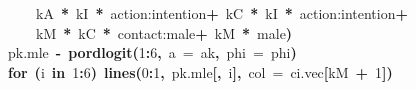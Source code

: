 \documentclass{article}
\makeatletter
\newcommand{\hlnumber}[1]{\textcolor[rgb]{0,0,0}{#1}}%
\newcommand{\hlfunctioncall}[1]{\textcolor[rgb]{.5,0,.33}{\textbf{#1}}}%
\newcommand{\hlkeyword}[1]{\textbf{#1}}%
\newcommand{\hlargument}[1]{\textcolor[rgb]{.69,.25,.02}{#1}}%
\newcommand{\hlassignement}[1]{\textbf{#1}}%
\newcommand{\hlsymbol}[1]{#1}%
\newcommand{\hlstd}[1]{\textcolor[rgb]{0,0,0}{#1}}%
\newenvironment{kframe}{%
 \def\FrameCommand##1{\hskip\@totalleftmargin \hskip-\fboxsep
 \colorbox{shadecolor}{##1}\hskip-\fboxsep
     \hskip-\linewidth \hskip-\@totalleftmargin \hskip\columnwidth}%
 \MakeFramed {\advance\hsize-\width
   \@totalleftmargin\z@ \linewidth\hsize
   \@setminipage}}%
 {\par\unskip\endMakeFramed}
\newenvironment{knitrout}{}{} %
\makeatother
\begin{document}
\begin{knitrout}
{\begin{kframe}
\begin{flushleft}
\hlstd{}{\ }{\ }{\ }{\ }{\ }{\ }{\ }{\ }{\ }{\ }{\ }{\ }\hlsymbol{kA}{\ }\hlkeyword{*}{\ }\hlsymbol{kI}{\ }\hlkeyword{*}{\ }\hlsymbol{\usebox{\hlnormalsizeboxbacktick}action:intention\usebox{\hlnormalsizeboxbacktick}}{\ }\hlkeyword{+}{\ }\hlsymbol{kC}{\ }\hlkeyword{*}{\ }\hlsymbol{kI}{\ }\hlkeyword{*}{\ }\hlsymbol{\usebox{\hlnormalsizeboxbacktick}action:intention\usebox{\hlnormalsizeboxbacktick}}{\ }\hlkeyword{+}\hspace*{\fill}\\
\hlstd{}{\ }{\ }{\ }{\ }{\ }{\ }{\ }{\ }{\ }{\ }{\ }{\ }\hlsymbol{kM}{\ }\hlkeyword{*}{\ }\hlsymbol{kC}{\ }\hlkeyword{*}{\ }\hlsymbol{\usebox{\hlnormalsizeboxbacktick}contact:male\usebox{\hlnormalsizeboxbacktick}}{\ }\hlkeyword{+}{\ }\hlsymbol{kM}{\ }\hlkeyword{*}{\ }\hlsymbol{male}\hlkeyword{)}\hspace*{\fill}\\
\hlstd{}{\ }{\ }{\ }{\ }{\ }{\ }{\ }{\ }\hlsymbol{pk.mle}{\ }\hlassignement{\usebox{\hlnormalsizeboxlessthan}-}{\ }\hlfunctioncall{pordlogit}\hlkeyword{(}\hlnumber{1}\hlkeyword{:}\hlnumber{6}\hlkeyword{,}{\ }\hlargument{a}{\ }\hlargument{=}{\ }\hlsymbol{ak}\hlkeyword{,}{\ }\hlargument{phi}{\ }\hlargument{=}{\ }\hlsymbol{phi}\hlkeyword{)}\hspace*{\fill}\\
\hlstd{}{\ }{\ }{\ }{\ }{\ }{\ }{\ }{\ }\hlkeyword{for}{\ }\hlkeyword{(}\hlsymbol{i}{\ }\hlkeyword{in}{\ }\hlnumber{1}\hlkeyword{:}\hlnumber{6}\hlkeyword{)}{\ }\hlfunctioncall{lines}\hlkeyword{(}\hlnumber{0}\hlkeyword{:}\hlnumber{1}\hlkeyword{,}{\ }\hlsymbol{pk.mle}\hlkeyword{[}\hlkeyword{,}{\ }\hlsymbol{i}\hlkeyword{]}\hlkeyword{,}{\ }\hlargument{col}{\ }\hlargument{=}{\ }\hlsymbol{ci.vec}\hlkeyword{[}\hlsymbol{kM}{\ }\hlkeyword{+}{\ }\hlnumber{1}\hlkeyword{]}\hlkeyword{)}\hspace*{\fill}\\
\hlstd{}{\ }{\ }{\ }{\ }\hlkeyword{\usebox{\hlnormalsizeboxclosebrace}}\hspace*{\fill}\\
\hlstd{}\hlkeyword{\usebox{\hlnormalsizeboxclosebrace}}\mbox{}
\normalfont
\end{flushleft}

\end{kframe}}
\end{knitrout}
\end{document}
